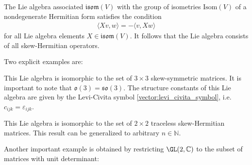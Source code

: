     \begin{example}[Isometries]
        The Lie algebra associated $\mathfrak{isom}(V)$ with the group of isometries $\mathrm{Isom}(V)$ of a nondegenerate Hermitian form satisfies the condition
        \begin{gather}
            \label{lie:lie_isometry}
            \langle Xv,w \rangle = -\langle v,Xw \rangle
        \end{gather}
        for all Lie algebra elements $X\in\mathfrak{isom}(V)$. It follows that the Lie algebra consists of all skew-Hermitian operators.
    \end{example}
    Two explicit examples are:
    \begin{example}\label{lie:so3}
        This Lie algebra is isomorphic to the set of $3\times3$ skew-symmetric matrices. It is important to note that $\mathfrak{o}(3)=\mathfrak{so}(3)$. The structure constants of this Lie algebra are given by the Levi-Civita symbol \ref{vector:levi_civita_symbol}, i.e. $c_{ijk}=\varepsilon_{ijk}$.
    \end{example}
    \begin{example}
        This Lie algebra is isomorphic to the set of $2\times2$ traceless skew-Hermitian matrices. This result can be generalized to arbitrary $n\in\mathbb{N}$.
    \end{example}
    Another important example is obtained by restricting $\GL(2,\mathbb{C})$ to the subset of matrices with unit determinant:
